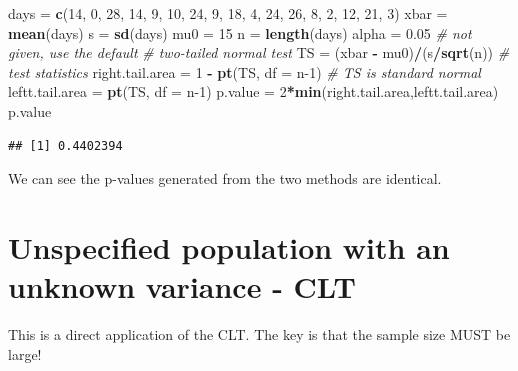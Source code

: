 \documentclass[
]{book}
\newenvironment{Shaded}{\begin{snugshade}}{\end{snugshade}}
\newcommand{\AttributeTok}[1]{\textcolor[rgb]{0.13,0.29,0.53}{#1}}
\newcommand{\CommentTok}[1]{\textcolor[rgb]{0.56,0.35,0.01}{\textit{#1}}}
\newcommand{\DecValTok}[1]{\textcolor[rgb]{0.00,0.00,0.81}{#1}}
\newcommand{\FloatTok}[1]{\textcolor[rgb]{0.00,0.00,0.81}{#1}}
\newcommand{\FunctionTok}[1]{\textcolor[rgb]{0.13,0.29,0.53}{\textbf{#1}}}
\newcommand{\NormalTok}[1]{#1}
\newcommand{\OtherTok}[1]{\textcolor[rgb]{0.56,0.35,0.01}{#1}}
\newcommand{\SpecialCharTok}[1]{\textcolor[rgb]{0.81,0.36,0.00}{\textbf{#1}}}
\begin{document}
\begin{Shaded}
\begin{Highlighting}[]
\NormalTok{days }\OtherTok{=} \FunctionTok{c}\NormalTok{(}\DecValTok{14}\NormalTok{, }\DecValTok{0}\NormalTok{, }\DecValTok{28}\NormalTok{, }\DecValTok{14}\NormalTok{, }\DecValTok{9}\NormalTok{, }\DecValTok{10}\NormalTok{, }\DecValTok{24}\NormalTok{, }\DecValTok{9}\NormalTok{, }\DecValTok{18}\NormalTok{, }\DecValTok{4}\NormalTok{, }\DecValTok{24}\NormalTok{, }\DecValTok{26}\NormalTok{, }\DecValTok{8}\NormalTok{, }\DecValTok{2}\NormalTok{, }\DecValTok{12}\NormalTok{, }\DecValTok{21}\NormalTok{, }\DecValTok{3}\NormalTok{)}
\NormalTok{xbar }\OtherTok{=} \FunctionTok{mean}\NormalTok{(days)}
\NormalTok{s }\OtherTok{=} \FunctionTok{sd}\NormalTok{(days)}
\NormalTok{mu0 }\OtherTok{=} \DecValTok{15}
\NormalTok{n }\OtherTok{=} \FunctionTok{length}\NormalTok{(days)}
\NormalTok{alpha }\OtherTok{=} \FloatTok{0.05}    \CommentTok{\# not given, use the default}
\CommentTok{\# two{-}tailed normal test}
\NormalTok{TS }\OtherTok{=}\NormalTok{ (xbar }\SpecialCharTok{{-}}\NormalTok{ mu0)}\SpecialCharTok{/}\NormalTok{(s}\SpecialCharTok{/}\FunctionTok{sqrt}\NormalTok{(n))    }\CommentTok{\# test statistics}
\NormalTok{right.tail.area }\OtherTok{=} \DecValTok{1} \SpecialCharTok{{-}} \FunctionTok{pt}\NormalTok{(TS, }\AttributeTok{df =}\NormalTok{ n}\DecValTok{{-}1}\NormalTok{)         }\CommentTok{\# TS is standard normal}
\NormalTok{leftt.tail.area }\OtherTok{=} \FunctionTok{pt}\NormalTok{(TS, }\AttributeTok{df =}\NormalTok{ n}\DecValTok{{-}1}\NormalTok{) }
\NormalTok{p.value }\OtherTok{=} \DecValTok{2}\SpecialCharTok{*}\FunctionTok{min}\NormalTok{(right.tail.area,leftt.tail.area)}
\NormalTok{p.value}
\end{Highlighting}
\end{Shaded}

\begin{verbatim}
## [1] 0.4402394
\end{verbatim}

We can see the p-values generated from the two methods are identical.

\hypertarget{unspecified-population-with-an-unknown-variance---clt}{%
\section{Unspecified population with an unknown variance - CLT}\label{unspecified-population-with-an-unknown-variance---clt}}

This is a direct application of the CLT. The key is that the sample size MUST be large!
\end{document}
